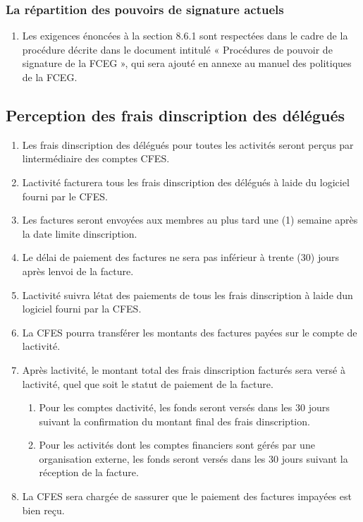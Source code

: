 \subsubsection{La répartition des pouvoirs de signature actuels}
\label{la-repartition-des-pouvoirs-de-signature-actuels}

\begin{enumerate}
 \item
  Les exigences énoncées à la section 8.6.1 sont respectées dans le cadre de la procédure décrite dans le document intitulé « Procédures de pouvoir de signature de la FCEG », qui sera ajouté en annexe au manuel des politiques de la FCEG.
\end{enumerate}

\subsection{Perception des frais d\textquotesingle inscription des délégués}
\label{perception-des-frais-d-inscription-des-delegues}

\begin{enumerate}
 \item
  Les frais d\textquotesingle inscription des délégués pour toutes les activités seront perçus par l\textquotesingle intermédiaire des comptes CFES.
 \item
  L\textquotesingle activité facturera tous les frais d\textquotesingle inscription des délégués à l\textquotesingle aide du logiciel fourni par le CFES.
 \item
  Les factures seront envoyées aux membres au plus tard une (1) semaine après la date limite d\textquotesingle inscription.
 \item
  Le délai de paiement des factures ne sera pas inférieur à trente (30) jours après l\textquotesingle envoi de la facture.
 \item
  L\textquotesingle activité suivra l\textquotesingle état des paiements de tous les frais d\textquotesingle inscription à l\textquotesingle aide d\textquotesingle un logiciel fourni par la CFES.
 \item
  La CFES pourra transférer les montants des factures payées sur le compte de l\textquotesingle activité.
 \item
  Après l\textquotesingle activité, le montant total des frais d\textquotesingle inscription facturés sera versé à l\textquotesingle activité, quel que soit le statut de paiement de la facture.

  \begin{enumerate}
   \item
    Pour les comptes d\textquotesingle activité, les fonds seront versés dans les 30 jours suivant la confirmation du montant final des frais d\textquotesingle inscription.
   \item
    Pour les activités dont les comptes financiers sont gérés par une organisation externe, les fonds seront versés dans les 30 jours suivant la réception de la facture.
  \end{enumerate}
 \item
  La CFES sera chargée de s\textquotesingle assurer que le paiement des factures impayées est bien reçu.
\end{enumerate}

